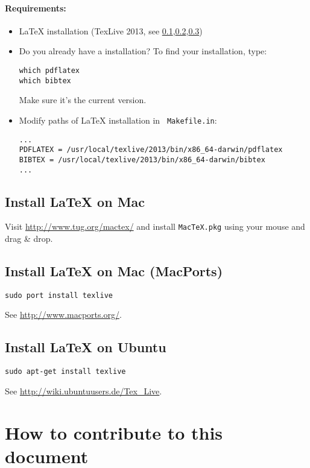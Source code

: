 \documentclass{scrartcl}
\begin{document}
\paragraph{Requirements:}
\begin{itemize}
\item LaTeX installation (TexLive 2013, see \ref{sec:mac1},\ref{sec:mac2},\ref{sec:ubuntu})
\item Do you already have a installation?  To find your installation, type:
\begin{Verbatim}
which pdflatex
which bibtex
\end{Verbatim}
Make sure it's the current version. 

\item Modify paths of LaTeX installation in \verb- Makefile.in-:
\vspace{2mm}
\begin{Verbatim}[frame=single,label=Makefile.in]
...
PDFLATEX = /usr/local/texlive/2013/bin/x86_64-darwin/pdflatex
BIBTEX = /usr/local/texlive/2013/bin/x86_64-darwin/bibtex
...
\end{Verbatim}
\end{itemize}

\subsection{Install LaTeX on Mac}\label{sec:mac1}
Visit \url{http://www.tug.org/mactex/} and install \verb-MacTeX.pkg- using your mouse and drag \& drop.

\subsection{Install LaTeX on Mac (MacPorts)}\label{sec:mac2}
\begin{Verbatim}
sudo port install texlive
\end{Verbatim}
See \url{http://www.macports.org/}.

\subsection{Install LaTeX on Ubuntu}\label{sec:ubuntu}
\begin{Verbatim}
sudo apt-get install texlive
\end{Verbatim}
See \url{http://wiki.ubuntuusers.de/Tex_Live}.

\section{How to contribute to this document} 
\end{document}
